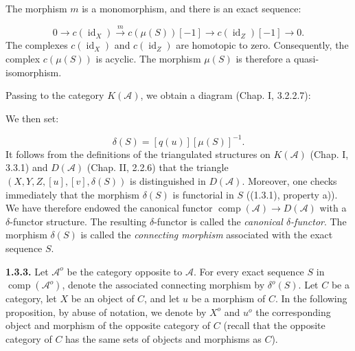 \clearpage
{}%
\begingroup\small\setlength{\parskip}{0pt}\setlength{\emergencystretch}{1.5em}
\setlength{\abovedisplayskip}{4pt plus 2pt minus 2pt}%
\setlength{\belowdisplayskip}{4pt plus 2pt minus 2pt}%

The morphism $m$ is a monomorphism, and there is an exact sequence:

\begin{equation}
0\longrightarrow c(\operatorname{id}_X)
\xrightarrow{m}c(\mu(S))[-1]
\longrightarrow c(\operatorname{id}_Z)[-1]
\longrightarrow0.
\tag{1.3.2.3}
\end{equation}
The complexes $c(\operatorname{id}_X)$ and $c(\operatorname{id}_Z)$ are
homotopic to zero. Consequently, the complex $c(\mu(S))$ is acyclic. The
morphism $\mu(S)$ is therefore a quasi-isomorphism.

Passing to the category $K(\mathcal A)$, we obtain a diagram (Chap. I,
3.2.2.7):
\begin{center}
\end{center}
We then set:

\begin{equation}
\delta(S)=[q(u)][\mu(S)]^{-1}.
\tag{1.3.2.4}
\end{equation}
It follows from the definitions of the triangulated structures on
$K(\mathcal A)$ (Chap. I, 3.3.1) and $D(\mathcal A)$ (Chap. II, 2.2.6)
that the triangle $(X,Y,Z,[u],[v],\delta(S))$ is distinguished in
$D(\mathcal A)$. Moreover, one checks immediately that the morphism
$\delta(S)$ is functorial in $S$ ((1.3.1), property a)). We have therefore
endowed the canonical functor
$\operatorname{comp}(\mathcal A)\longrightarrow D(\mathcal A)$ with a
$\delta$-functor structure. The resulting $\delta$-functor is called the
\emph{canonical $\delta$-functor}. The morphism $\delta(S)$ is called the
\emph{connecting morphism} associated with the exact sequence $S$.

\medskip\noindent\textbf{1.3.3.}\quad
Let $\mathcal A^o$ be the category opposite to $\mathcal A$. For every exact
sequence $S$ in $\operatorname{comp}(\mathcal A^o)$, denote the associated
connecting morphism by $\delta^o(S)$. Let $C$ be a category, let $X$ be an
object of $C$, and let $u$ be a morphism of $C$. In the following
proposition, by abuse of notation, we denote by $X^o$ and $u^o$ the
corresponding object and morphism of the opposite category of $C$ (recall
that the opposite category of $C$ has the same sets of objects and
morphisms as $C$).

